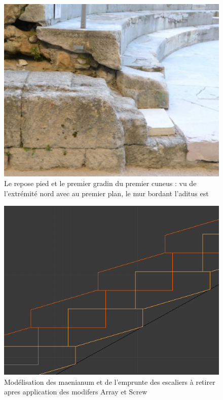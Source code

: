 		\begin{figure}[!h] %
			\center
			\includegraphics[scale=0.3]{images/gradinCoupe.png}
			\caption{Le repose pied et le premier gradin du premier cuneus : vu de l'extrémité nord avec au premier plan, le mur bordant l'aditus est} %
			\label{coupeGradin} %
		\end{figure} %
		
		\begin{figure}[!h] 
			\center
			\includegraphics[scale=0.3]{images/escaliers.png}
			\caption{Modélisation des maenianum et de l'emprunte des escaliers à retirer apres application des modifers Array et Screw}
		\end{figure}
		
